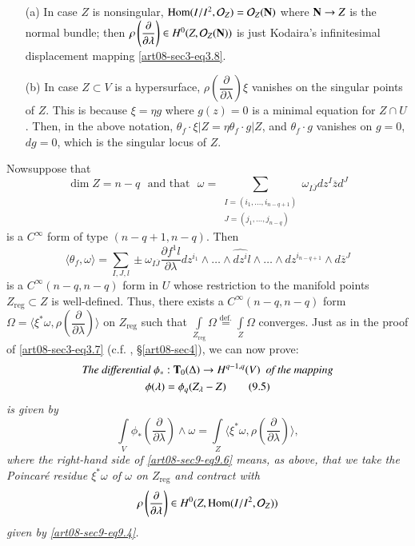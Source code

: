 \begin{examples*}
\begin{itemize}
\item[(a)] In case $Z$ is nonsingular, $\operatorname{\mathrm{Hom}}(I/I^{2},\mathcal{O}_{Z})=\mathcal{O}_{Z}(\mathbf{N})$ where $\mathbf{N}\to Z$ is the normal bundle; then $\rho\left(\dfrac{\partial}{\partial\lambda}\right)\in H^{0}(Z,\mathcal{O}_{Z}(\mathbf{N}))$ is just Kodaira's infinitesimal displacement mapping \eqref{art08-sec3-eq3.8}.

\item[(b)] In case $Z\subset V$ is a hypersurface, $\rho\left(\dfrac{\partial}{\partial\lambda}\right)\xi$ vanishes on the singular points of $Z$. This is because $\xi=\eta g$ where $g(z)=0$ is a minimal equation for $Z\cap U$. Then, in the above notation, $\theta_{f}\cdot \xi|Z=\eta\theta_{f}\cdot g|Z$, and $\theta_{f}\cdot g$ vanishes on $g=0$, $dg=0$, which is the singular locus of $Z$.
\end{itemize}
\end{examples*}

Now\pageoriginale suppose that 
$$
\dim Z=n-q\text{~ and that~ }\omega=\sum\limits_{\substack{I=(i_{1},\ldots,i_{n-q+1})\\ J=(j_{1},\ldots,j_{n-q})}}\omega_{I\overline{J}}dz^{I}\overline{z}d^{J}
$$
is a $C^{\infty}$ form of type $(n-q+1,n-q)$. Then
$$
\langle \theta_{f},\omega\rangle = \sum\limits_{I,J,l}\pm \omega_{I\overline{J}}\dfrac{\partial f^{1}l}{\partial \lambda}dz^{i_{1}}\wedge\ldots\wedge \widehat{dz^{i}}l\wedge\ldots\wedge dz^{i_{n-q+1}}\wedge d\overline{z}^{J}
$$
is a $C^{\infty}(n-q,n-q)$ form in $U$ whose restriction to the manifold points $Z_{\text{reg}}\subset Z$ is well-defined. Thus, there exists a $C^{\infty}(n-q,n-q)$ form $\Omega=\langle \xi^{*}\omega,\rho\left(\dfrac{\partial}{\partial\lambda}\right)\rangle$ on $Z_{\text{reg}}$ such that $\int\limits_{Z_{\text{reg}}}\Omega\displaystyle{\mathop{=}\limits^{\text{def.}}}\int\limits_{Z}\Omega$ converges. Just as in the proof of \eqref{art08-sec3-eq3.7} (c.f. \cite{art08-key9}, \S\ref{art08-sec4}), we can now prove:
\begin{gather*}
\text{\em The differential } \phi_{*}:\mathbf{T}_{0}(\Delta)\to H^{q-1,q}(V) \text{\em ~ of the mapping}\notag\\
\phi(\lambda)=\phi_{q}(Z_{\lambda}-Z)\tag{9.5}\label{art08-sec9-eq9.5}
\end{gather*}
{\em is given by}
\begin{equation*}
\int\limits_{V}\phi_{*}\left(\dfrac{\partial}{\partial \lambda}\right)\wedge\omega=\int\limits_{Z}\langle \xi^{*}\omega, \rho\left(\dfrac{\partial}{\partial\lambda}\right)\rangle,\tag{9.6}\label{art08-sec9-eq9.6}
\end{equation*}
{\em where the right-hand side of \eqref{art08-sec9-eq9.6} means, as above, that we take the Poincar\'e residue $\xi^{*}\omega$ of $\omega$ on $Z_{\text{reg}}$ and contract with 
$$
\rho\left(\dfrac{\partial}{\partial \lambda}\right)\in H^{0}(Z,\operatorname{\mathrm{Hom}}(I/I^{2},\mathcal{O}_{Z}))
$$ 
given by \eqref{art08-sec9-eq9.4}.}

